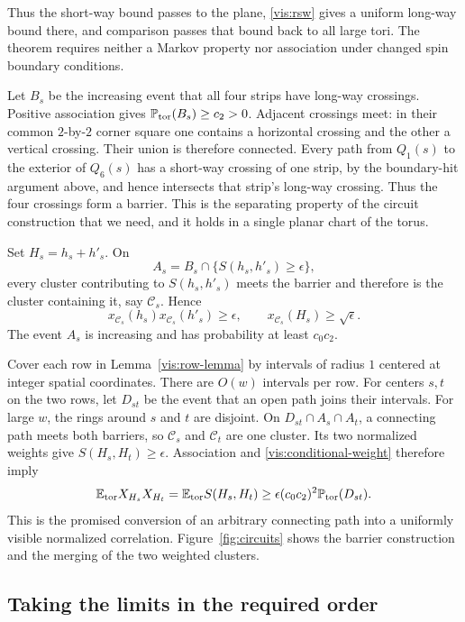 Thus the short-way bound passes to the plane, \eqref{vis:rsw} gives a
uniform long-way bound there, and comparison passes that bound back
to all large tori.  The theorem requires neither a Markov property nor
association under changed spin boundary conditions.

Let $B_s$ be the increasing event that all four strips have long-way
crossings.  Positive association gives $\mathbb P_{\mathrm{tor}}(B_s)\ge c_2>0$.
Adjacent crossings meet: in their common $2$-by-$2$ corner square one
contains a horizontal crossing and the other a vertical crossing.
Their union is therefore connected.  Every path from $Q_1(s)$ to the
exterior of $Q_6(s)$ has a short-way crossing of one strip, by the
boundary-hit argument above, and hence intersects that strip's long-way
crossing.  Thus the four crossings form a barrier.  This is the
separating property of the circuit construction that we need, and
it holds in a single planar chart of the torus.

Set $H_s=h_s+h'_s$.  On
\[
 A_s=B_s\cap\{S(h_s,h'_s)\ge\epsilon\},
\]
every cluster contributing to $S(h_s,h'_s)$ meets the barrier and
therefore is the cluster containing it, say $\mathcal C_s$.  Hence
\[
 x_{\mathcal C_s}(h_s)x_{\mathcal C_s}(h'_s)\ge\epsilon,
 \qquad x_{\mathcal C_s}(H_s)\ge\sqrt\epsilon.
\]
The event $A_s$ is increasing and has probability at least $c_0c_2$.

Cover each row in Lemma~\ref{vis:row-lemma} by intervals of radius $1$
centered at integer spatial coordinates.  There are $O(w)$ intervals
per row.  For centers $s,t$ on the two rows, let $D_{st}$ be the event
that an open path joins their intervals.
For large $w$, the rings around $s$ and $t$ are disjoint.
On $D_{st}\cap A_s\cap A_t$, a connecting path meets both barriers,
so $\mathcal C_s$ and $\mathcal C_t$ are one cluster.  Its two
normalized weights give $S(H_s,H_t)\ge\epsilon$.  Association and
\eqref{vis:conditional-weight} therefore imply
\begin{equation}\label{vis:bridge}
 \mathbb E_{\mathrm{tor}}X_{H_s}X_{H_t}
 =\mathbb E_{\mathrm{tor}}S(H_s,H_t)
 \ge\epsilon(c_0c_2)^2\mathbb P_{\mathrm{tor}}(D_{st}).
\end{equation}
This is the promised conversion of an arbitrary connecting path into
a uniformly visible normalized correlation. Figure~\ref{fig:circuits}
shows the barrier construction and the merging of the two weighted
clusters.



\subsection{Taking the limits in the required order}


